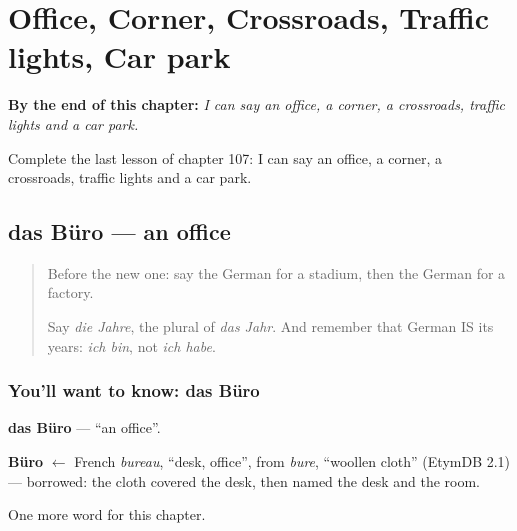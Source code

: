 
\chapter{Office, Corner, Crossroads, Traffic lights, Car park}
\label{ch:ge-office-corner-crossroads-traffic-lights-car-park}

\begin{chapteropening}
\textbf{By the end of this chapter:} \emph{I can say an office, a corner, a crossroads, traffic lights and a car park.}

Complete the last lesson of chapter 107: I can say an office, a corner, a crossroads, traffic lights and a car park.
\end{chapteropening}

\section[das Büro]{das Büro — an office}

\label{lesson:GE-C107-buero}



\begin{quote}
Before the new one: say the German for a stadium, then the German for a factory.

Say \emph{die Jahre}, the plural of \emph{das Jahr}. And remember that German IS its years: \emph{ich bin}, not \emph{ich habe}.
\end{quote}

\subsection*{You'll want to know: das Büro}
\textbf{das Büro} — \textquotedblleft{}an office\textquotedblright{}.

\begin{cousinweb}
\textbf{Büro} $\leftarrow$ French \emph{bureau}, \textquotedblleft{}desk, office\textquotedblright{}, from \emph{bure}, \textquotedblleft{}woollen cloth\textquotedblright{} (EtymDB 2.1) — borrowed: the cloth covered the desk, then named the desk and the room.
\end{cousinweb}

\begin{grammarlens}[title={What you've built}]
One more word for this chapter.
\end{grammarlens}

